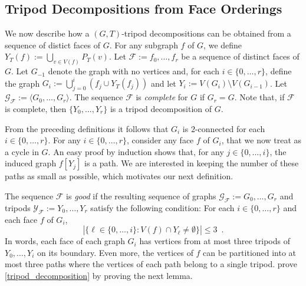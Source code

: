 \documentclass{patmorin}
\begin{document}

\subsection{Tripod Decompositions from Face Orderings}
\label{orderings}

We now describe how a $(G,T)$-tripod decompositions can be obtained from a sequence of distict faces of $G$.  For any subgraph $f$ of $G$, we define $Y_T(f):=\bigcup_{v\in V(f)} P_T(v)$.  Let $\mathcal{F}:=f_0,\ldots,f_{r}$ be a sequence of distinct faces of $G$. Let $G_{-1}$ denote the graph with no vertices and, for each $i\in\{0,\ldots,r\}$, define the graph $G_i:=\bigcup_{j=0}^i (f_j\cup Y_T(f_j))$ and let $Y_i:=V(G_i)\setminus V(G_{i-1})$.  Let $\mathcal{G_F}:=\langle G_0,\ldots,G_{r}\rangle$.  The sequence $\mathcal{F}$ is \emph{complete} for $G$ if $G_r=G$.  Note that, if $\mathcal{F}$ is complete, then $\{Y_0,\ldots,Y_r\}$ is a tripod decomposition of $G$.

From the preceding definitions it follows that $G_i$ is $2$-connected for each $i\in\{0,\ldots,r\}$.  For any $i\in\{0,\ldots,r\}$, consider any face $f$ of $G_i$, that we now treat as a cycle in $G$. An easy proof by induction shows that, for any $j\in\{0,\ldots,i\}$, the induced graph $f[Y_j]$ is a path.
We are interested in keeping the number of these paths as small as possible, which motivates our next definition.

The sequence $\mathcal{F}$ is \emph{good} if the resulting sequence of graphs $\mathcal{G}_\mathcal{F}:=G_0,\ldots,G_r$ and tripods $\mathcal{Y}_\mathcal{F}:=Y_0,\ldots,Y_r$ satisfy the following condition:  For each $i\in\{0,\ldots, r\}$ and each face $f$ of $G_i$,
\[
   |\{\ell\in\{0,\ldots,i\}: V(f)\cap Y_{\ell}\neq\emptyset\}|\le 3 \enspace .
\]
In words, each face of each graph $G_i$ has vertices from at most three tripods of $Y_0,\ldots,Y_i$ on its boundary.  Even more, the vertices of $f$ can be partitioned into at most three paths where the vertices of each path belong to a single tripod. \citet{dujmovic.joret.ea:planar} prove \cref{tripod_decomposition} by proving the next lemma.
\end{document}
